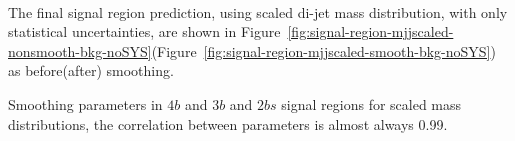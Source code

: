 \paragraph{}
The final signal region prediction, using scaled di-jet mass distribution, with only statistical uncertainties, are shown in Figure~\ref{fig:signal-region-mjjscaled-nonsmooth-bkg-noSYS}(Figure~\ref{fig:signal-region-mjjscaled-smooth-bkg-noSYS}) as before(after) smoothing.

\begin{table}[htbp!]
\begin{center}

\caption{Smoothing parameters in $4b$ and $3b$ and $2bs$ signal regions for scaled mass distributions, the correlation between parameters is almost always 0.99.}
\label{tab:smoothparams_pole}
\end{center}
\end{table}


